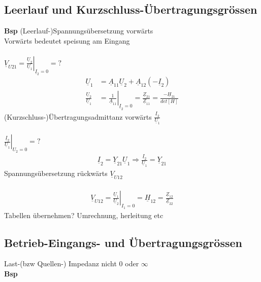 \subsection{Leerlauf und Kurzschluss-Übertragungsgrössen}
\textbf{Bsp} (Leerlauf-)Spannungsübersetzung vorwärts\\
Vorwärts bedeutet speisung am Eingang\\
\\
	$\underline{V}_{U21}=\left.\frac{\underline{U}_2}{\underline{U}_1}\right|_{\underline{I}_2=0}=?$\\
\begin{align}
	\underline{U}_1&=\underline{A}_{11}\underline{U}_{2}+\underline{A}_{12}\left(-\underline{I}_2\right)\nonumber\\
	\frac{\underline{U}_2}{\underline{U}_1}&=\left.\frac{1}{\underline{A}_{11}}\right|_{\underline{I}_2=0}=\frac{\underline{Z}_{21}}{\underline{Z}_{11}}=\frac{-\underline{H}_{21}}{det[H]}\nonumber
\end{align}
(Kurzschluss-)Übertragungsadmittanz vorwärts
$\frac{\underline{I}_2}{\underline{U}_1}$\\
\\
	$\left.\frac{\underline{I}_2}{\underline{U}_1}\right|_{U_2=0}=?$\\
\begin{align}
	\underline{I}_2=\underline{Y}_{21}\underline{U}_1\Rightarrow\frac{\underline{I}_2}{\underline{U}_1}=\underline{Y}_{21}\nonumber
\end{align}
Spannungsübersetzung rückwärts $\underline{V}_{U12}$\\
\\
\begin{align}
	\underline{V}_{U12}=\left.\frac{\underline{U}_1}{\underline{U}_2}\right|_{I_1=0}=\underline{H}_{12}=\frac{\underline{Z}_{12}}{\underline{Z}_{22}}\nonumber
\end{align}
Tabellen übernehmen? Umrechnung, herleitung etc\\
\subsection{Betrieb-Eingangs- und Übertragungsgrössen}
Last-(bzw Quellen-) Impedanz nicht $0$ oder $\infty$ \\
\textbf{Bsp} \\
